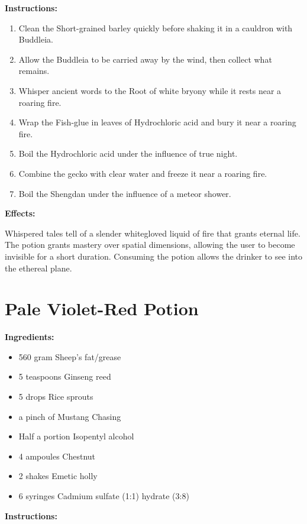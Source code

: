 \documentclass{article}
\begin{document}
\textbf{Instructions:}

\begin{enumerate}
  \item Clean the Short-grained barley quickly before shaking it in a cauldron with Buddleia.
  \item Allow the Buddleia to be carried away by the wind, then collect what remains.
  \item Whisper ancient words to the Root of white bryony while it rests near a roaring fire.
  \item Wrap the Fish-glue in leaves of Hydrochloric acid and bury it near a roaring fire.
  \item Boil the Hydrochloric acid under the influence of true night.
  \item Combine the gecko with clear water and freeze it near a roaring fire.
  \item Boil the Shengdan under the influence of a meteor shower.
\end{enumerate}

\textbf{Effects:}

Whispered tales tell of a slender whitegloved liquid of fire that grants eternal life. The potion grants mastery over spatial dimensions, allowing the user to become invisible for a short duration. Consuming the potion allows the drinker to see into the ethereal plane.

\newpage
\section*{Pale Violet-Red Potion}

\textbf{Ingredients:}

\begin{itemize}
  \item 560 gram Sheep's fat/grease
  \item 5 teaspoons Ginseng reed
  \item 5 drops Rice sprouts
  \item a pinch of Mustang Chasing
  \item Half a portion Isopentyl alcohol
  \item 4 ampoules Chestnut
  \item 2 shakes Emetic holly
  \item 6 syringes Cadmium sulfate (1:1) hydrate (3:8)
\end{itemize}

\textbf{Instructions:}
\end{document}
